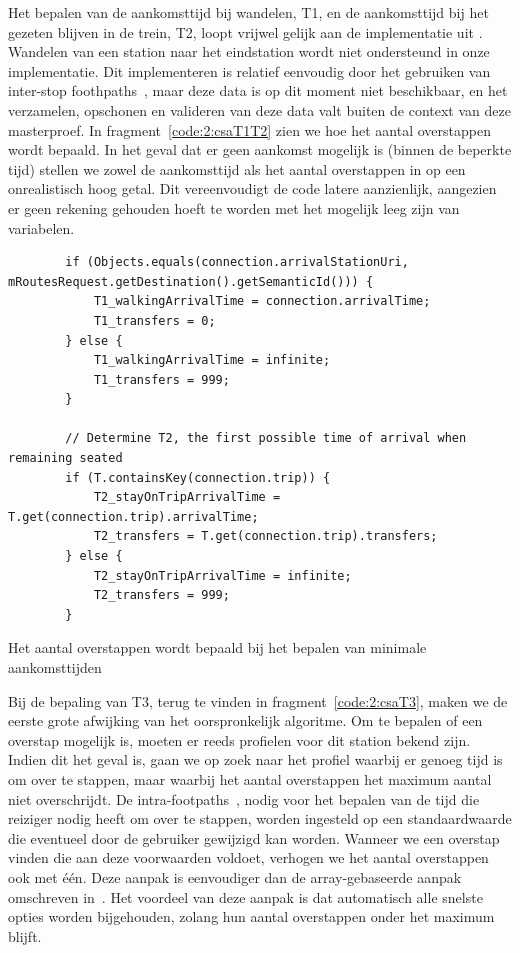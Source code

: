 Het bepalen van de aankomsttijd bij wandelen, T1, en de aankomsttijd bij het gezeten blijven in de trein, T2, loopt vrijwel gelijk aan de implementatie uit \cite{strasser17}. Wandelen van een station naar het eindstation wordt niet ondersteund in onze implementatie. Dit implementeren is relatief eenvoudig door het gebruiken van inter-stop foothpaths~\citep{strasser17,hannemann08}, maar deze data is op dit moment niet beschikbaar, en het verzamelen, opschonen en valideren van deze data valt buiten de context van deze masterproef. In fragment~\ref{code:2:csaT1T2} zien we hoe het aantal overstappen wordt bepaald. In het geval dat er geen aankomst mogelijk is (binnen de beperkte tijd) stellen we zowel de aankomsttijd als het aantal overstappen in op een onrealistisch hoog getal. Dit vereenvoudigt de code latere aanzienlijk, aangezien er geen rekening gehouden hoeft te worden met het mogelijk leeg zijn van variabelen.
\begin{code}[h]
	\begin{verbatim}
	 	if (Objects.equals(connection.arrivalStationUri, mRoutesRequest.getDestination().getSemanticId())) {
			T1_walkingArrivalTime = connection.arrivalTime;
			T1_transfers = 0;
		} else {
			T1_walkingArrivalTime = infinite;
			T1_transfers = 999;
		}

		// Determine T2, the first possible time of arrival when remaining seated
		if (T.containsKey(connection.trip)) {
			T2_stayOnTripArrivalTime = T.get(connection.trip).arrivalTime;
			T2_transfers = T.get(connection.trip).transfers;
		} else {
			T2_stayOnTripArrivalTime = infinite;
			T2_transfers = 999;
		}	
		\end{verbatim}
					\caption[CSA: Bepalen van aankomsttijden]{Het aantal overstappen wordt bepaald bij het bepalen van minimale aankomsttijden}
		\label{code:2:csaT1T2}
\end{code}

Bij de bepaling van T3, terug te vinden in fragment~\ref{code:2:csaT3}, maken we de eerste grote afwijking van het oorspronkelijk algoritme. Om te bepalen of een overstap mogelijk is, moeten er reeds profielen voor dit station bekend zijn. Indien dit het geval is, gaan we op zoek naar het profiel waarbij er genoeg tijd is om over te stappen, maar waarbij het aantal overstappen het maximum aantal niet overschrijdt. 
De intra-footpaths~\citep{strasser17,hannemann08}, nodig voor het bepalen van de tijd die reiziger nodig heeft om over te stappen, worden ingesteld op een standaardwaarde die eventueel door de gebruiker gewijzigd kan worden.
Wanneer we een overstap vinden die aan deze voorwaarden voldoet, verhogen we het aantal overstappen ook met één. Deze aanpak is eenvoudiger dan de array-gebaseerde aanpak omschreven in~\cite{strasser17}. Het voordeel van deze aanpak is dat automatisch alle snelste opties worden bijgehouden, zolang hun aantal overstappen onder het maximum blijft. 

